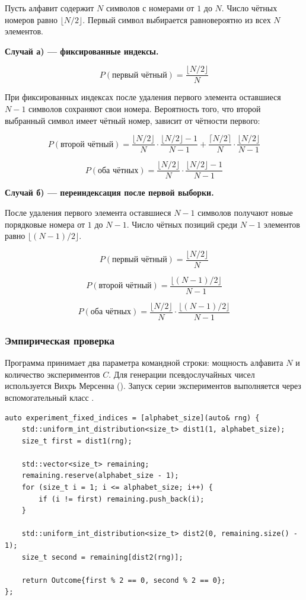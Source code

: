 \documentclass[14pt]{extarticle}
\renewcommand{\texttt}[1]{{\codefont \seqsplit{#1}}}
\begin{document}
Пусть алфавит содержит \(N\) символов с номерами от \(1\) до \(N\). Число чётных номеров равно \(\lfloor N/2 \rfloor\). Первый символ выбирается равновероятно из всех \(N\) элементов.

\textbf{Случай а) --- фиксированные индексы.}

$$P(\text{первый чётный}) = \frac{\lfloor N/2 \rfloor}{N}$$

При фиксированных индексах после удаления первого элемента оставшиеся \(N-1\) символов сохраняют свои номера. Вероятность того, что второй выбранный символ имеет чётный номер, зависит от чётности первого:

$$P(\text{второй чётный}) = \frac{\lfloor N/2 \rfloor}{N} \cdot \frac{\lfloor N/2 \rfloor - 1}{N-1} + \frac{\lceil N/2 \rceil}{N} \cdot \frac{\lfloor N/2 \rfloor}{N-1}$$

$$P(\text{оба чётных}) = \frac{\lfloor N/2 \rfloor}{N} \cdot \frac{\lfloor N/2 \rfloor - 1}{N - 1}$$

\textbf{Случай б) --- переиндексация после первой выборки.}

После удаления первого элемента оставшиеся \(N-1\) символов получают новые порядковые номера от \(1\) до \(N-1\). Число чётных позиций среди \(N-1\) элементов равно \(\lfloor (N-1)/2 \rfloor\).

$$P(\text{первый чётный}) = \frac{\lfloor N/2 \rfloor}{N}$$

$$P(\text{второй чётный}) = \frac{\lfloor (N-1)/2 \rfloor}{N-1}$$

$$P(\text{оба чётных}) = \frac{\lfloor N/2 \rfloor}{N} \cdot \frac{\lfloor (N-1)/2 \rfloor}{N-1}$$
\subsubsection{Эмпирическая проверка}
\label{sec:orgca83fdb}

Программа принимает два параметра командной строки: мощность алфавита \(N\) и количество экспериментов \(C\). Для генерации псевдослучайных чисел используется Вихрь Мерсенна (\texttt{std::mt19937}). Запуск серии экспериментов выполняется через вспомогательный класс \texttt{TaskRunner}.

\begin{listing}[htbp]
\caption{Эксперимент с фиксированными индексами}
\begin{verbatim}
auto experiment_fixed_indices = [alphabet_size](auto& rng) {
    std::uniform_int_distribution<size_t> dist1(1, alphabet_size);
    size_t first = dist1(rng);

    std::vector<size_t> remaining;
    remaining.reserve(alphabet_size - 1);
    for (size_t i = 1; i <= alphabet_size; i++) {
        if (i != first) remaining.push_back(i);
    }

    std::uniform_int_distribution<size_t> dist2(0, remaining.size() - 1);
    size_t second = remaining[dist2(rng)];

    return Outcome{first % 2 == 0, second % 2 == 0};
};
\end{verbatim}
\end{listing}
\end{document}
